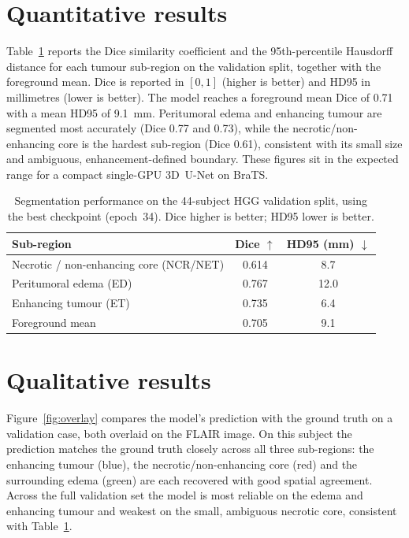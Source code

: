 \section{Quantitative results}

Table~\ref{tab:results} reports the Dice similarity coefficient and the
95th-percentile Hausdorff distance for each tumour sub-region on the validation
split, together with the foreground mean. Dice is reported in $[0,1]$ (higher is
better) and HD95 in millimetres (lower is better). The model reaches a foreground
mean Dice of 0.71 with a mean HD95 of 9.1~mm. Peritumoral edema and enhancing
tumour are segmented most accurately (Dice 0.77 and 0.73), while the
necrotic/non-enhancing core is the hardest sub-region (Dice 0.61), consistent with
its small size and ambiguous, enhancement-defined boundary. These figures sit in
the expected range for a compact single-GPU 3D~U-Net on BraTS.

\begin{table}[t]
\centering
\caption{Segmentation performance on the 44-subject HGG validation split,
using the best checkpoint (epoch~34). Dice higher is better; HD95 lower is better.}
\label{tab:results}
\begin{tabular}{@{}lcc@{}}
\toprule
Sub-region & Dice $\uparrow$ & HD95 (mm) $\downarrow$ \\
\midrule
Necrotic / non-enhancing core (NCR/NET) & 0.614 & 8.7 \\
Peritumoral edema (ED)                  & 0.767 & 12.0 \\
Enhancing tumour (ET)                   & 0.735 & 6.4 \\
\midrule
Foreground mean                         & 0.705 & 9.1 \\
\bottomrule
\end{tabular}
\end{table}

\section{Qualitative results}

Figure~\ref{fig:overlay} compares the model's prediction with the ground truth on
a validation case, both overlaid on the FLAIR image. On this subject the
prediction matches the ground truth closely across all three sub-regions: the
enhancing tumour (blue), the necrotic/non-enhancing core (red) and the surrounding
edema (green) are each recovered with good spatial agreement. Across the full
validation set the model is most reliable on the edema and enhancing tumour and
weakest on the small, ambiguous necrotic core, consistent with
Table~\ref{tab:results}.

